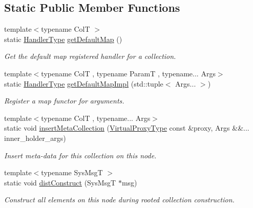 \subsection*{Static Public Member Functions}
\begin{DoxyCompactItemize}
\item 
{\footnotesize template$<$typename ColT $>$ }\\static \hyperlink{namespacevt_af64846b57dfcaf104da3ef6967917573}{Handler\+Type} \hyperlink{structvt_1_1vrt_1_1collection_1_1_collection_manager_aa371f1cdd4eafa9f75b7eb40a6f151e0}{get\+Default\+Map} ()
\begin{DoxyCompactList}\small\item\em Get the default map registered handler for a collection. \end{DoxyCompactList}\item 
{\footnotesize template$<$typename ColT , typename ParamT , typename... Args$>$ }\\static \hyperlink{namespacevt_af64846b57dfcaf104da3ef6967917573}{Handler\+Type} \hyperlink{structvt_1_1vrt_1_1collection_1_1_collection_manager_ae92ad81b99b380b0b87b85f7dbda767a}{get\+Default\+Map\+Impl} (std\+::tuple$<$ Args... $>$)
\begin{DoxyCompactList}\small\item\em Register a map functor for arguments. \end{DoxyCompactList}\item 
{\footnotesize template$<$typename ColT , typename... Args$>$ }\\static void \hyperlink{structvt_1_1vrt_1_1collection_1_1_collection_manager_a1220f88fee25f84133a271ff19762b62}{insert\+Meta\+Collection} (\hyperlink{namespacevt_a1b417dd5d684f045bb58a0ede70045ac}{Virtual\+Proxy\+Type} const \&proxy, Args \&\&... inner\+\_\+holder\+\_\+args)
\begin{DoxyCompactList}\small\item\em Insert meta-\/data for this collection on this node. \end{DoxyCompactList}\item 
{\footnotesize template$<$typename Sys\+MsgT $>$ }\\static void \hyperlink{structvt_1_1vrt_1_1collection_1_1_collection_manager_ab82abba567a08d19a26618fe7c65452e}{dist\+Construct} (Sys\+MsgT $\ast$msg)
\begin{DoxyCompactList}\small\item\em Construct all elements on this node during rooted collection construction. \end{DoxyCompactList}\item 

\end{DoxyCompactItemize}
